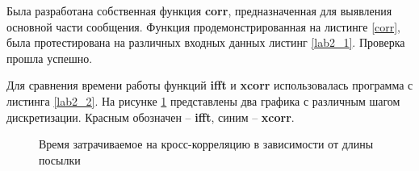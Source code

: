 \documentclass[a4paper,14pt]{extarticle}
\begin{document}
Была разработана собственная функция \textbf{corr}, предназначенная для выявления основной части сообщения. Функция продемонстрированная на листинге \ref{corr}, была протестирована на различных входных данных листинг \ref{lab2_1}. Проверка прошла успешно.

Для сравнения времени работы функций \textbf{ifft} и \textbf{xcorr} использовалась программа с листинга \ref{lab2_2}. На рисунке \ref{015}  представлены два графика с различным шагом дискретизации. Красным обозначен -- \textbf{ifft}, синим -- \textbf{xcorr}.

\begin{figure}[H]
\begin{minipage}[h]{0.49\linewidth}
\end{minipage}
\hfill
\begin{minipage}[h]{0.49\linewidth}
\end{minipage}
\caption{Время затрачиваемое на кросс-корреляцию в зависимости от длины посылки}
\label{015}
\end{figure}
\end{document}
